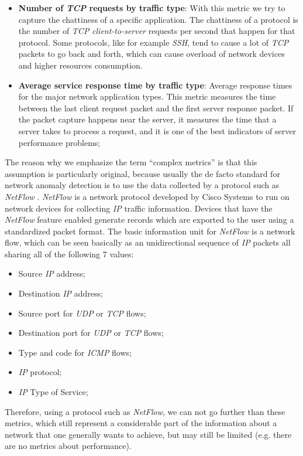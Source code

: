 \documentclass[12pt,a4paper,cucitura]{toptesi}
\begin{document}
\begin{itemize}
\item \textbf{Number of \emph{TCP} requests by traffic type}: With this metric we try to capture the chattiness of a specific application. The chattiness of a protocol is the number of \emph{TCP} \emph{client-to-server} requests per second that happen for that protocol. Some protocols, like for example \emph{SSH}, tend to cause a lot of \emph{TCP} packets to go back and forth, which can cause overload of network devices and higher resources consumption.
\item \textbf{Average service response time by traffic type}: Average response times for the major network application types. This metric measures the time between the last client request packet and the first server response packet. If the packet capture happens near the server, it measures the time that a server takes to process a request, and it is one of the best indicators of server performance problems;
\end{itemize}

The reason why we emphasize the term ``complex metrics'' is that this assumption is particularly original, because usually the de facto standard for network anomaly detection is to use the data collected by a protocol such as \emph{NetFlow} \cite{netflow}.
\emph{NetFlow} is a network protocol developed by Cisco Systems to run on network devices for collecting \emph{IP} traffic information.
Devices that have the \emph{NetFlow} feature enabled generate records which are exported to the user using a standardized packet format.
The basic information unit for \emph{NetFlow} is a network flow, which can be seen basically as an unidirectional sequence of \emph{IP} packets all sharing all of the following 7 values:

\begin{itemize}
\item Source \emph{IP} address;
\item Destination \emph{IP} address;
\item Source port for \emph{UDP} or \emph{TCP} flows;
\item Destination port for \emph{UDP} or \emph{TCP} flows;
\item Type and code for \emph{ICMP} flows;
\item \emph{IP} protocol;
\item \emph{IP} Type of Service;
\end{itemize}

Therefore, using a protocol such as \emph{NetFlow}, we can not go further than these metrics, which still represent a considerable part of the information about a network that one generally wants to achieve, but may still be limited (e.g. there are no metrics about performance).
\end{document}
